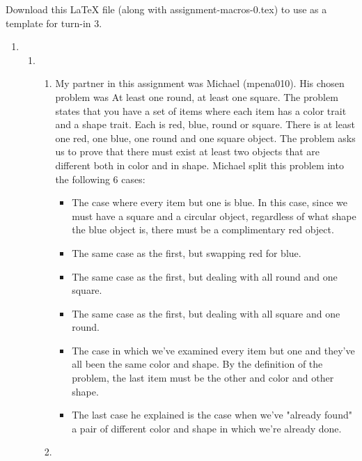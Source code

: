 \documentclass[11pt]{article}
\begin{document}
Download this LaTeX file (along with \textsf{assignment-macros-0.tex}) to use as a template for turn-in 3.


\begin{enumerate}


  \item %

  \begin{enumerate}
  \item %

    \begin{enumerate}
    \item

      My partner in this assignment was Michael (mpena010). His chosen problem was At least one round, at least one square. The problem states that you have a set of items where each item has a color trait and a shape trait. Each is red, blue, round or square. There is at least one red, one blue, one round and one square object. The problem asks us to prove that there must exist at least two objects that are different both in color and in shape. Michael split this problem into the following 6 cases:
      \begin{itemize}
        \item The case where every item but one is blue. In this case, since we must have a square and a circular object, regardless of what shape the blue object is, there must be a complimentary red object.
        \item The same case as the first, but swapping red for blue.
        \item The same case as the first, but dealing with all round and one square.
        \item The same case as the first, but dealing with all square and one round.
        \item The case in which we've examined every item but one and they've all been the same color and shape. By the definition of the problem, the last item must be the other and color and other shape.
        \item The last case he explained is the case when we've "already found" a pair of different color and shape in which we're already done.
      \end{itemize}

    \item


\end{enumerate}
\end{enumerate}
\end{enumerate}
\end{document}
